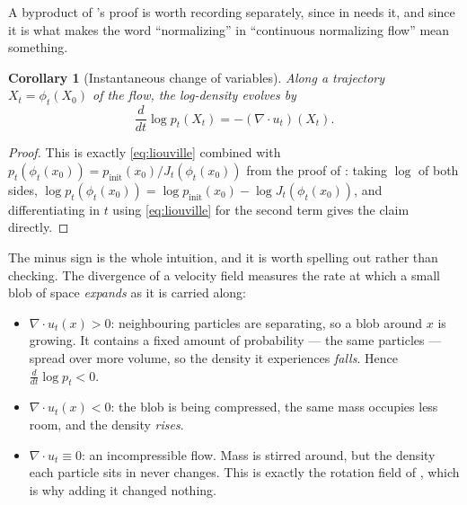 \documentclass[11pt,a4paper]{report}
\newtheorem{corollary}[corollary]{Corollary}
\theoremstyle{definition}
\theoremstyle{remark}
\begin{document}
A byproduct of 's proof is worth recording separately,
since  in  needs it,
and since it is what makes the word ``normalizing'' in ``continuous
normalizing flow'' mean something.

\begin{corollary}[Instantaneous change of variables]
\label{cor:instantaneous-cov}
Along a trajectory $X_t=\phi_t(X_0)$ of the flow, the log-density evolves by
\[
\frac{d}{dt}\log p_t(X_t) = -(\nabla\cdot u_t)(X_t) .
\]
\end{corollary}

\begin{proof}
This is exactly \eqref{eq:liouville} combined with
$p_t(\phi_t(x_0))=p_{\mathrm{init}}(x_0)/J_t(\phi_t(x_0))$ from the proof of
: taking $\log$ of both sides,
$\log p_t(\phi_t(x_0)) = \log p_{\mathrm{init}}(x_0) - \log J_t(\phi_t(x_0))$,
and differentiating in $t$ using \eqref{eq:liouville} for the second term
gives the claim directly.
\end{proof}

The minus sign is the whole intuition, and it is worth spelling out rather
than checking. The divergence of a velocity field measures the rate at
which a small blob of space \emph{expands} as it is carried along:

\begin{itemize}
\item $\nabla\cdot u_t(x) > 0$: neighbouring particles are separating, so a
      blob around $x$ is growing. It contains a fixed amount of
      probability --- the same particles --- spread over more volume, so the
      density it experiences \emph{falls}. Hence
      $\frac{d}{dt}\log p_t<0$.
\item $\nabla\cdot u_t(x) < 0$: the blob is being compressed, the same mass
      occupies less room, and the density \emph{rises}.
\item $\nabla\cdot u_t \equiv 0$: an incompressible flow. Mass is stirred
      around, but the density each particle sits in never changes. This is
      exactly the rotation field of , which is why
      adding it changed nothing.
\end{itemize}
\end{document}
